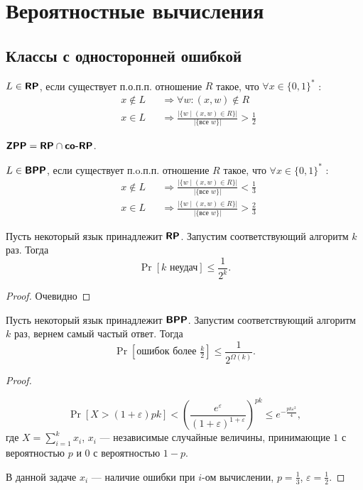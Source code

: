 
\section{Вероятностные вычисления}
\subsection{Классы с односторонней ошибкой}
\begin{defn}[Класс $ \RP$]\index{\RP}
	$ L \in \textmd{\textbf{\textsf{RP}}}$, если существует п.о.п.п. отношение $ R$ такое, что $ \forall x \in \{0, 1\}^{*}$ :
	\[
		\begin{aligned}
		&x \notin L && \Longrightarrow \forall w \colon (x, w) \notin R \\
		&x \in L && \Longrightarrow \frac{ \lvert \{w \mid (x, w) \in  R\} \rvert }{\lvert \{\text{все } w\} \rvert } > \frac{1}{2}
		\end{aligned}
	\]
\end{defn}
\begin{defn}\index{\ZPP}
	$ \textmd{\textbf{\textsf{ZPP}}} = \textmd{\textbf{\textsf{RP}}} \cap \textmd{\textbf{\textsf{co-RP}}}$.
\end{defn}

\begin{defn}\index{\BPP}
	$ L \in \textmd{\textbf{\textsf{BPP}}}$, если существует п.o.п.п. отношение $ R$ такое, что $ \forall x \in \{0, 1\}^{*}$ :
	\[
		\begin{aligned}
		&x \notin L && \Longrightarrow \frac{ \lvert \{w \mid (x, w) \in  R\} \rvert }{\lvert \{\text{все } w\} \rvert } < \frac{1}{3}\\
		&x \in L && \Longrightarrow \frac{ \lvert \{w \mid (x, w) \in  R\} \rvert }{\lvert \{\text{все } w\} \rvert } > \frac{2}{3}
		\end{aligned}
	\]
\end{defn}

\begin{lm}
	Пусть некоторый язык принадлежит $ \RP$. Запустим соответствующий алгоритм $ k$ раз. Тогда
	\[
		\Pr[k \text{ неудач}] \le \frac{1}{2^{k}}
	.\]
\end{lm}
\begin{proof}
	Очевидно
\end{proof}
\begin{lm}
	Пусть некоторый язык принадлежит $ \textmd{\textbf{\textsf{BPP}}}$. Запустим соответствующий алгоритм $ k$ раз, вернем самый частый ответ. Тогда
	\[
		\Pr[\text{ошибок более } \tfrac{k}{2}] \le \frac{1}{2^{\Omega (k)}}
	.\]
\end{lm}
\begin{proof}
	\begin{st}
		\[
			\Pr[X > (1+\varepsilon ) p k] < \left( \frac{e^{\varepsilon }}{(1+\varepsilon)^{1+\varepsilon } } \right) ^{p k} \le e^{-\frac{pk \varepsilon ^2}{4}}
		,\]
		где $ X = \sum_{i=1}^{k} x_i$, $ x_{i}$ --- независимые случайные величины, принимающие $ 1$ с вероятностью $ p$ и $ 0$ с вероятностью $ 1-p$.
	\end{st}
	В данной задаче $ x_i$ --- наличие ошибки при $ i$-ом вычислении, $ p = \frac{1}{3}$, $ \varepsilon  = \frac{1}{2}$.
\end{proof}

